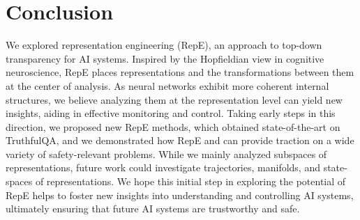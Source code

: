 \section{Conclusion}
We explored representation engineering (RepE), an approach to top-down transparency for AI systems. Inspired by the Hopfieldian view in cognitive neuroscience, RepE places representations and the transformations between them at the center of analysis. As neural networks exhibit more coherent internal structures, we believe analyzing them at the representation level can yield new insights, aiding in effective monitoring and control. Taking early steps in this direction, we proposed new RepE methods, which obtained state-of-the-art on TruthfulQA, and we demonstrated how RepE and can provide traction on a wide variety of safety-relevant problems. While we mainly analyzed subspaces of representations, future work could investigate trajectories, manifolds, and state-spaces of representations. We hope this initial step in exploring the potential of RepE helps to foster new insights into understanding and controlling AI systems, ultimately ensuring that future AI systems are trustworthy and safe.
